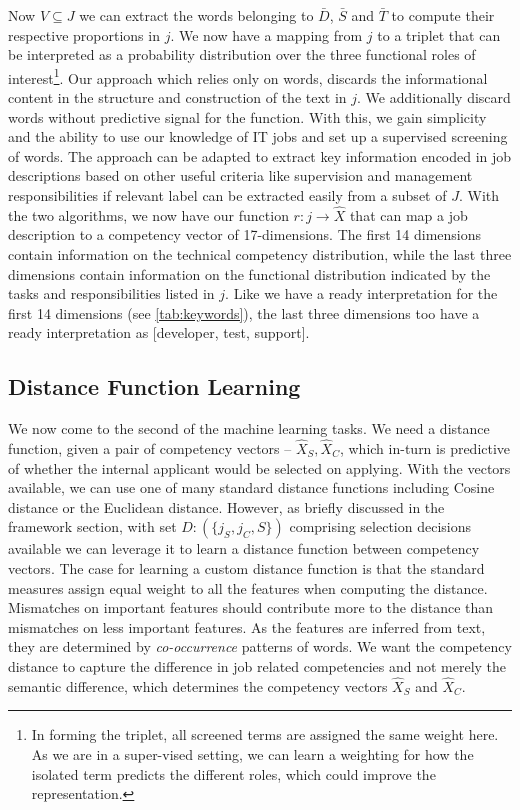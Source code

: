 \documentclass{article}
\begin{document}
Now \(V \subseteq J\) we can extract the words belonging to \(\bar{D}\), \(\bar{S}\) and \(\bar{T}\) to compute their respective proportions in \(j\). We now have a mapping from \(j\) to a triplet that can be interpreted as a probability distribution over the three functional roles of interest\footnote{In forming the triplet, all screened terms are assigned the same weight here. As we are in a super-vised setting, we can learn a weighting for how the isolated term predicts the different roles, which could improve the representation.}. Our approach which relies only on words, discards the informational content in the structure and construction of the text in \(j\). We additionally discard words without predictive signal for the function. With this, we gain simplicity and the ability to use our knowledge of IT jobs and set up a supervised screening of words. The approach can be adapted to extract key information encoded in job descriptions based on other useful criteria like supervision and management responsibilities if relevant label can be extracted easily from a subset of \(J\). With the two algorithms, we now have our function \(r: j \rightarrow \hat{X}\) that can map a job description to a competency vector of 17-dimensions. The first 14 dimensions contain information on the technical competency distribution, while the last three dimensions contain information on the functional distribution indicated by the tasks and responsibilities listed in \(j\). Like we have a ready interpretation for the first 14 dimensions (see \autoref{tab:keywords}), the last three dimensions too have a ready interpretation as [developer, test, support].



\subsection{Distance Function Learning}

We now come to the second of the machine learning tasks. We need a distance function, given a pair of competency vectors -- \( \hat{X}_S, \hat{X}_C \), which in-turn is predictive of whether the internal applicant would be selected on applying. With the vectors available, we can use one of many standard distance functions including Cosine distance or the Euclidean distance. However, as briefly discussed in the framework section, with set \(D: (\{j_S, j_C, S\})\) comprising selection decisions available we can leverage it to learn a distance function between competency vectors. The case for learning a custom distance function is that the standard measures assign equal weight to all the features when computing the distance. Mismatches on important features should contribute more to the distance than mismatches on less important features. As the features are inferred from text, they are determined by \textit{co-occurrence} patterns of words. We want the competency distance to capture the difference in job related competencies and not merely the semantic difference, which determines the competency vectors \( \hat{X}_S \) and \( \hat{X}_C \).
\end{document}
